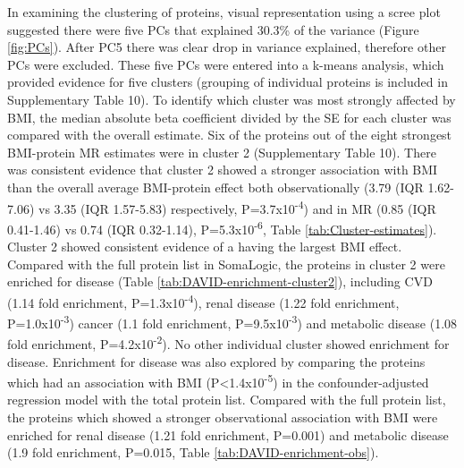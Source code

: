\documentclass[11pt,twoside]{bristolthesis}
\begin{document}
In examining the clustering of proteins, visual representation using a scree plot suggested there were five PCs that explained 30.3\% of the variance (Figure \ref{fig:PCs}). After PC5 there was clear drop in variance explained, therefore other PCs were excluded. These five PCs were entered into a k-means analysis, which provided evidence for five clusters (grouping of individual proteins is included in Supplementary Table 10). To identify which cluster was most strongly affected by BMI, the median absolute beta coefficient divided by the SE for each cluster was compared with the overall estimate. Six of the proteins out of the eight strongest BMI-protein MR estimates were in cluster 2 (Supplementary Table 10). There was consistent evidence that cluster 2 showed a stronger association with BMI than the overall average BMI-protein effect both observationally (3.79 (IQR 1.62-7.06) vs 3.35 (IQR 1.57-5.83) respectively, P=3.7x10\textsuperscript{-4}) and in MR (0.85 (IQR 0.41-1.46) vs 0.74 (IQR 0.32-1.14), P=5.3x10\textsuperscript{-6}, Table \ref{tab:Cluster-estimates}). Cluster 2 showed consistent evidence of a having the largest BMI effect. Compared with the full protein list in SomaLogic, the proteins in cluster 2 were enriched for disease (Table \ref{tab:DAVID-enrichment-cluster2}), including CVD (1.14 fold enrichment, P=1.3x10\textsuperscript{-4}), renal disease (1.22 fold enrichment, P=1.0x10\textsuperscript{-3}) cancer (1.1 fold enrichment, P=9.5x10\textsuperscript{-3}) and metabolic disease (1.08 fold enrichment, P=4.2x10\textsuperscript{-2}). No other individual cluster showed enrichment for disease. Enrichment for disease was also explored by comparing the proteins which had an association with BMI (P\textless1.4x10\textsuperscript{-5}) in the confounder-adjusted regression model with the total protein list. Compared with the full protein list, the proteins which showed a stronger observational association with BMI were enriched for renal disease (1.21 fold enrichment, P=0.001) and metabolic disease (1.9 fold enrichment, P=0.015, Table \ref{tab:DAVID-enrichment-obs}).
\end{document}
